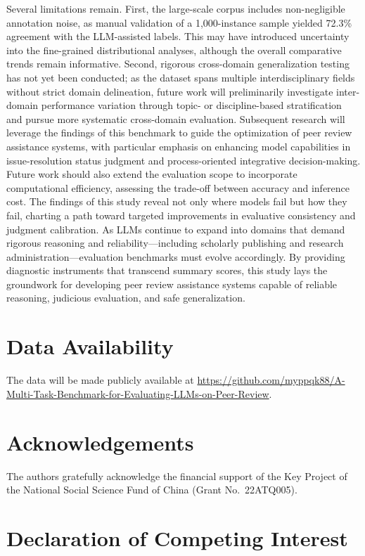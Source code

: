\documentclass[preprint,10pt,times]{elsarticle}
\begin{document}
Several limitations remain. First, the large-scale corpus includes non-negligible annotation noise, as manual validation of a 1,000-instance sample yielded 72.3\% agreement with the LLM-assisted labels. This may have introduced uncertainty into the fine-grained distributional analyses, although the overall comparative trends remain informative. Second, rigorous cross-domain generalization testing has not yet been conducted; as the dataset spans multiple interdisciplinary fields without strict domain delineation, future work will preliminarily investigate inter-domain performance variation through topic- or discipline-based stratification and pursue more systematic cross-domain evaluation. Subsequent research will leverage the findings of this benchmark to guide the optimization of peer review assistance systems, with particular emphasis on enhancing model capabilities in issue-resolution status judgment and process-oriented integrative decision-making. Future work should also extend the evaluation scope to incorporate computational efficiency, assessing the trade-off between accuracy and inference cost. The findings of this study reveal not only where models fail but how they fail, charting a path toward targeted improvements in evaluative consistency and judgment calibration. As LLMs continue to expand into domains that demand rigorous reasoning and reliability---including scholarly publishing and research administration---evaluation benchmarks must evolve accordingly. By providing diagnostic instruments that transcend summary scores, this study lays the groundwork for developing peer review assistance systems capable of reliable reasoning, judicious evaluation, and safe generalization.

\section*{Data Availability}

The data will be made publicly available at \url{https://github.com/myppqk88/A-Multi-Task-Benchmark-for-Evaluating-LLMs-on-Peer-Review}.

\section*{Acknowledgements}

The authors gratefully acknowledge the financial support of the Key Project of the National Social Science Fund of China (Grant No.\ 22ATQ005).

\section*{Declaration of Competing Interest}
\end{document}

